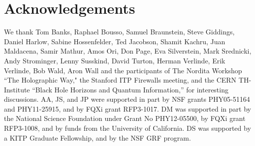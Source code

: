 \documentclass[12pt]{article}
\begin{document}
\section*{Acknowledgements}
We thank Tom Banks, Raphael Bousso, Samuel Braunstein, Steve Giddings, Daniel Harlow, Sabine Hossenfelder, Ted Jacobson, Shamit Kachru, Juan Maldacena, Samir Mathur, Amos Ori, Don Page, Eva Silverstein, Mark Srednicki, Andy Strominger, Lenny Susskind, David Turton, Herman Verlinde, Erik Verlinde, Bob Wald, Aron Wall and the participants of The Nordita Workshop ``The Holographic Way," the Stanford ITP Firewalls meeting, and the CERN TH-Institute ``Black Hole Horizons and Quantum Information,'' for interesting discussions.
AA, JS, and JP were supported in part by NSF grants PHY05-51164 and PHY11-25915, and by FQXi grant RFP3-1017.  DM was supported in part by the National Science Foundation under Grant No PHY12-05500,  by FQXi grant RFP3-1008, and by funds from the University of California.  DS was supported by a KITP Graduate Fellowship, and by the NSF GRF program.
\end{document}
